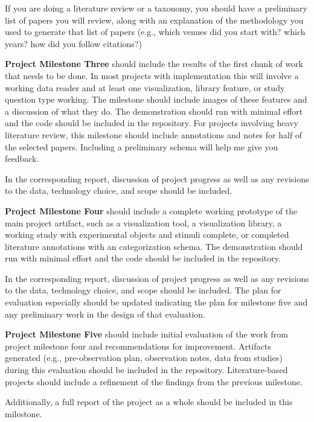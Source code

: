 If you are doing a literature review or a taxonomy, you should have a
preliminary list of papers you will review, along with an explanation of the
methodology you used to generate that list of papers (e.g., which venues did
you start with? which years? how did you follow citations?)

\vspace{1.5ex}\noindent\textbf{Project Milestone Three} should include the
results of the first chunk of work that needs to be done. In most projects
with implementation this will involve a working data reader and at least one visualization,
library feature, or study question type working. The milestone should include
images of these features and a discussion of what they do. The demonstration
should run with minimal effort and the code should be included in the
repository. For projects involving heavy literature review, this milestone
should include annotations and notes for half of the selected papers.
Including a preliminary schema will help me give you feedback.

In the corresponding report, discussion of project progress as well as any
revisions to the data, technology choice, and scope should be included.

\vspace{1.5ex}\noindent\textbf{Project Milestone Four} should include a
complete working prototype of the main project artifact, such as a
visualization tool, a visualization library, a working study with experimental
objects and stimuli complete, or completed literature annotations with an
categorization schema. The demonstration should run with minimal effort and
the code should be included in the repository.

In the corresponding report, discussion of project progress as well as any
revisions to the data, technology choice, and scope should be included. The
plan for evaluation especially should be updated indicating the plan for
milestone five and any preliminary work in the design of that evaluation.


\vspace{1.5ex}\noindent\textbf{Project Milestone Five} should include initial
evaluation of the work from project milestone four and recommendations for
improvement. Artifacts generated (e.g., pre-observation
plan, observation notes, data from studies) during this evaluation should be
included in the repository. Literature-based projects should include a
refinement of the findings from the previous milestone.

Additionally, a full report of the project as a whole should be included in
this milestone.



